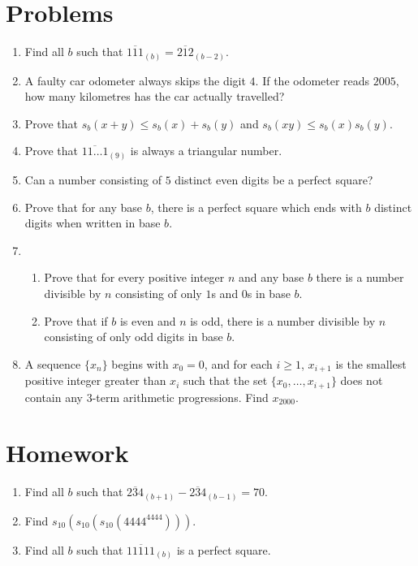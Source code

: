 \documentclass{article}
\begin{document}
\section{Problems}
\begin{enumerate}
    \item Find all $b$ such that $\overline{111}_{(b)}=\overline{212}_{(b-2)}$.
    \item A faulty car odometer always skips the digit $4$. If the odometer
        reads $2005$, how many kilometres has the car actually travelled?
    \item Prove that $s_b(x+y)\le s_b(x)+s_b(y)$ and $s_b(xy)\le s_b(x)s_b(y)$.
    \item Prove that $\overline{11\ldots1}_{(9)}$ is always a triangular number.
    \item Can a number consisting of $5$ distinct even digits be a perfect
        square?
    \item Prove that for any base $b$, there is a perfect square which ends with
        $b$ distinct digits when written in base $b$.
    \item
    \begin{enumerate}
      \item Prove that for every positive integer $n$ and any base $b$
          there is a number divisible by $n$ consisting of only $1$s and $0$s in
          base $b$.
      \item Prove that if $b$ is even and $n$ is odd, there is a number divisible by $n$
          consisting of only odd digits in base $b$.
    \end{enumerate}
    \item A sequence $\{x_n\}$ begins with $x_0=0$, and for each $i\ge 1$,
        $x_{i+1}$ is the smallest positive integer greater than $x_i$ such that
        the set $\{x_0,\ldots,x_{i+1}\}$ does not contain any 3-term arithmetic
        progressions. Find $x_{2000}$.
\end{enumerate}
\newpage
\section{Homework}
\begin{enumerate}
    \item Find all $b$ such that
        $\overline{234}_{(b+1)}-\overline{234}_{(b-1)}=70$.
    \item Find $s_{10}(s_{10}(s_{10}(4444^{4444})))$.
    \item Find all $b$ such that $\overline{11111}_{(b)}$ is a perfect square.
\end{enumerate}
\end{document}
